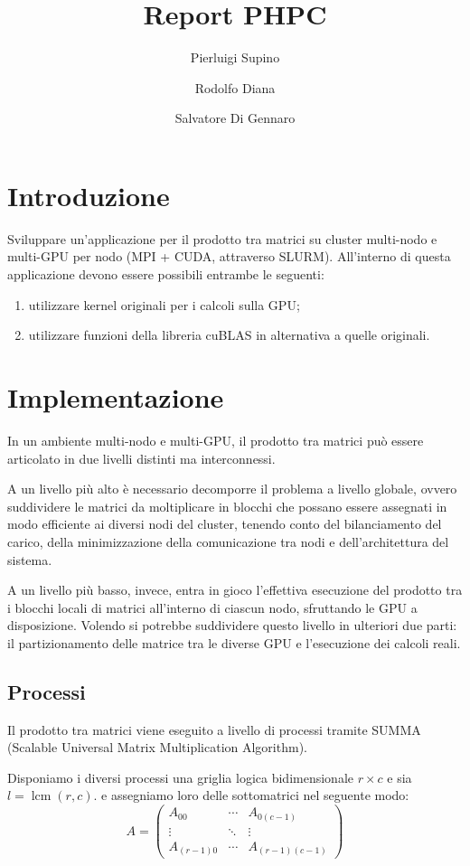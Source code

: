 \documentclass[a4paper]{article}
\title{Report PHPC}
\author{Pierluigi Supino \and Rodolfo Diana \and Salvatore Di Gennaro}
\DeclareMathOperator{\lcm}{lcm}
\begin{document}
\maketitle
\tableofcontents

\section{Introduzione}

Sviluppare un’applicazione per il prodotto tra matrici su cluster multi-nodo e multi-GPU per nodo (MPI + CUDA, attraverso SLURM). All’interno di questa applicazione devono essere possibili entrambe le seguenti:
\begin{enumerate}
    \item utilizzare kernel originali per i calcoli sulla GPU;
    \item utilizzare funzioni della libreria cuBLAS in alternativa a quelle originali.
\end{enumerate}

\section{Implementazione}
In un ambiente multi-nodo e multi-GPU, il prodotto tra matrici può essere articolato in due livelli distinti ma interconnessi.

A un livello più alto è necessario decomporre il problema a livello globale, ovvero suddividere le matrici da moltiplicare in blocchi che possano essere assegnati in modo efficiente ai diversi nodi del cluster, tenendo conto del bilanciamento del carico, della minimizzazione della comunicazione tra nodi e dell'architettura del sistema.

A un livello più basso, invece, entra in gioco l’effettiva esecuzione del prodotto tra i blocchi locali di matrici all’interno di ciascun nodo, sfruttando le GPU a disposizione. Volendo si potrebbe suddividere questo livello in ulteriori due parti: il partizionamento delle matrice tra le diverse GPU e l'esecuzione dei calcoli reali.

\subsection{Processi}
Il prodotto tra matrici viene eseguito a livello di processi tramite SUMMA (Scalable Universal Matrix Multiplication Algorithm)\cite{SUMMA}.

Disponiamo i diversi processi una griglia logica bidimensionale $r \times c$ e sia $l=\lcm(r, c)$. e assegniamo loro delle sottomatrici nel seguente modo:
$$
    A=
    \begin{pmatrix}
        A_{00}     & \cdots & A_{0(c-1)}     \\
        \vdots     & \ddots & \vdots         \\
        A_{(r-1)0} & \cdots & A_{(r-1)(c-1)}
    \end{pmatrix}
$$
\end{document}
